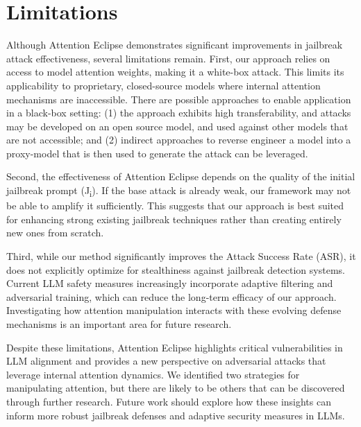 \section{Limitations}

 
Although Attention Eclipse demonstrates significant improvements in jailbreak attack effectiveness, several limitations remain.  First, our approach relies on access to model attention weights, making it a white-box attack. This limits its applicability to proprietary, closed-source models where internal attention mechanisms are inaccessible. There are possible approaches to enable application in a black-box setting: (1) the approach exhibits high transferability, and attacks may be developed on an open source model, and used against other models that are not accessible; and (2) indirect approaches to reverse engineer a model into a proxy-model that is then used to generate the attack can be leveraged.

Second, the effectiveness of Attention Eclipse depends on the quality of the initial jailbreak prompt (J\textsubscript{i}). If the base attack is already weak, our framework may not be able to amplify it sufficiently. This suggests that our approach is best suited for enhancing strong existing jailbreak techniques rather than creating entirely new ones from scratch.  

Third, while our method significantly improves the Attack Success Rate (ASR), it does not explicitly optimize for stealthiness against jailbreak detection systems. Current LLM safety measures increasingly incorporate adaptive filtering and adversarial training, which can reduce the long-term efficacy of our approach. Investigating how attention manipulation interacts with these evolving defense mechanisms is an important area for future research.  

 
Despite these limitations, Attention Eclipse highlights critical vulnerabilities in LLM alignment and provides a new perspective on adversarial attacks that leverage internal attention dynamics.  We identified two strategies for manipulating attention, but there are likely to be others that can be discovered through further research.  Future work should explore how these insights can inform more robust jailbreak defenses and adaptive security measures in LLMs.